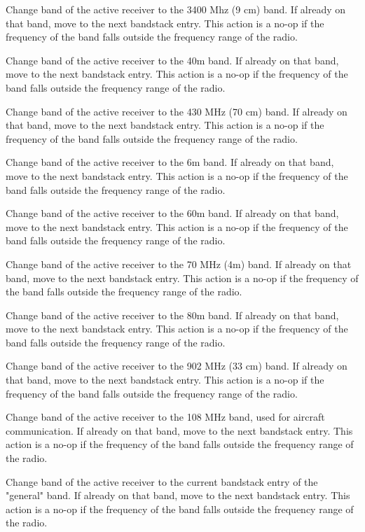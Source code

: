 \documentclass[12pt]{book}
\begin{document}
{Change band of the active receiver to the 3400 Mhz (9 cm) band. If already on that band, move to
the next bandstack entry. This action is a no-op if the frequency of the band falls outside the frequency range
of the radio.}

{Change band of the active receiver to the 40m band. If already on that band, move to
the next bandstack entry. This action is a no-op if the frequency of the band falls outside the frequency range
of the radio.}

{Change band of the active receiver to the 430 MHz (70 cm) band. If already on that band, move to
the next bandstack entry. This action is a no-op if the frequency of the band falls outside the frequency range
of the radio.}

{Change band of the active receiver to the 6m band. If already on that band, move to
the next bandstack entry. This action is a no-op if the frequency of the band falls outside the frequency range
of the radio.}

{Change band of the active receiver to the 60m band. If already on that band, move to
the next bandstack entry. This action is a no-op if the frequency of the band falls outside the frequency range
of the radio.}

{Change band of the active receiver to the 70 MHz (4m)  band. If already on that band, move to
the next bandstack entry. This action is a no-op if the frequency of the band falls outside the frequency range
of the radio.}

{Change band of the active receiver to the 80m band. If already on that band, move to
the next bandstack entry. This action is a no-op if the frequency of the band falls outside the frequency range
of the radio.}

{Change band of the active receiver to the 902 MHz (33 cm) band. If already on that band, move to
the next bandstack entry. This action is a no-op if the frequency of the band falls outside the frequency range
of the radio.}

{Change band of the active receiver to the 108 MHz band, used for aircraft communication. If already on that band, move to
the next bandstack entry. This action is a no-op if the frequency of the band falls outside the frequency range
of the radio.} 

{Change band of the active receiver to the current bandstack entry of the "general" band. If already on that band, move to
the next bandstack entry. This action is a no-op if the frequency of the band falls outside the frequency range
of the radio.}
\end{document}
